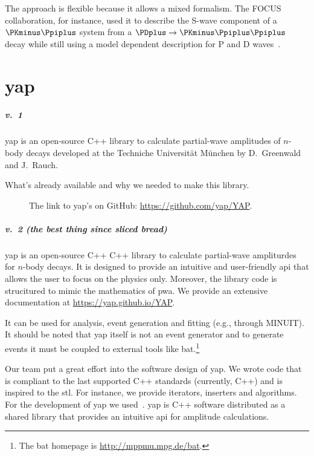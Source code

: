 \documentclass[
	fontsize=10pt,
	open=right,
	twoside,
    english,
    draft,
]{scrbook}
\newcommand{\MINUIT}{{\footnotesize{MINUIT}}}
\newcommand{\cpp}[1][]{{\footnotesize{C++\ifthenelse{\equal{#1}{}}{}{#1}}}}
\begin{document}
    The approach is flexible because it allows a mixed formalism.
    The FOCUS collaboration, for instance, used it to describe the S-wave component of a $\PKminus\Ppiplus$ system from a $\PDplus \to \PKminus\Ppiplus\Ppiplus$ decay while still using a model dependent description for P and D waves~\cite{Link200914}.


\chapter{\acs{yap}}

    \paragraph{v.~1}
    \ac{yap} is an open-source \cpp[14] library to calculate partial-wave amplitudes of $n$-body decays developed at the Techniche Universit\"at M\"unchen by D.~Greenwald and J.~Rauch. 

    What’s already available and why we needed to make this library.
    \begin{figure}
        \centering
        \caption{The link to \ac{yap}'s on GitHub: \url{https://github.com/yap/YAP}.}
    \end{figure}

    \paragraph{v.~2 (the best thing since sliced bread)}
    \ac{yap} is an open-source \cpp{}  C++ library to calculate partial-wave ampliturdes for $n$-body decays. 
    It is designed to provide an intuitive and user-friendly \ac{api} that allows the user to focus on the physics only.
    Moreover, the library code is strucitured to mimic the mathematics of \ac{pwa}.
    We provide an extensive documentation at \url{https://yap.github.io/YAP}.
    
    It can be used for analysis, event generation and fitting (e.g., through \MINUIT).
    It should be noted that \ac{yap} itself is not an event generator and to generate events it must be coupled to external tools like \ac{bat}.\footnote{The \ac{bat} homepage is \url{http://mppmu.mpg.de/bat}.}
    
    
    Our team put a great effort into the software design of \ac{yap}.
    We wrote code that is compliant to the last supported \cpp{} standards (currently, \cpp[14]) and is inspired to the \ac{stl}.
    For instance, we provide iterators, inserters and algorithms.
    For the development of \ac{yap} we used~\cite{stl_meyers,effective_cpp_meyers,effective_modern_cpp_meyers}.
    \Ac{yap} is {\footnotesize{C++}} software distributed as a shared library that provides an intuitive \ac{api} for amplitude calculations.
    
\end{document}
